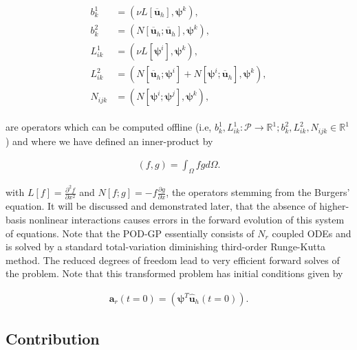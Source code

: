 \documentclass[preprint,12pt]{elsarticle}
\begin{document}
\begin{linenomath*}
\begin{align}
\begin{aligned} 
b_{k}^{1} &=\left(\nu L[\overline{\mathbf{u}}_h], \boldsymbol{\psi}^{k}\right), \\ 
b_{k}^{2} &=\left(N[\overline{\mathbf{u}}_h ; \overline{\mathbf{u}}_h], \boldsymbol{\psi}^{k}\right),  \\ 
L_{i k}^{1} &=\left(\nu L\left[\boldsymbol{\psi}^{i} \right], \boldsymbol{\psi}^{k} \right), \\ 
L_{i k}^{2} &=\left(N\left[\overline{\mathbf{u}}_h ; \boldsymbol{\psi}^{i}\right]+N\left[\boldsymbol{\psi}^{i} ; \overline{\mathbf{u}}_h\right], \boldsymbol{\psi}^{k}\right), \\ 
N_{i j k} &=\left(N\left[\boldsymbol{\psi}^{i} ; \boldsymbol{\psi}^{j}\right], \boldsymbol{\psi}^{k}\right),
\end{aligned}
\end{align}
\end{linenomath*}
are operators which can be computed offline (i.e, $b_k^1, L_{i k}^{1} : \mathcal{P} \rightarrow \mathbb{R}^{1}; b_k^2, L_{i k}^{2}, N_{i j k} \in \mathbb{R}^1$) and where we have defined an inner-product by
\begin{linenomath*}
\begin{align}
(f,g) = \int_\Omega fg d\Omega.
\end{align}
\end{linenomath*}
with $L[f] = \frac{\partial^2 f}{\partial x^2}$ and $N[f;g] = -f \frac{\partial g}{\partial x}$, the operators stemming from the Burgers' equation. It will be discussed and demonstrated later, that the absence of higher-basis nonlinear interactions causes errors in the forward evolution of this system of equations. Note that the POD-GP essentially consists of $N_r$ coupled ODEs and is solved by a standard total-variation diminishing third-order Runge-Kutta method. The reduced degrees of freedom lead to very efficient forward solves of the problem. Note that this transformed problem has initial conditions given by
\begin{linenomath*}
\begin{align}
\mathbf{a}_r(t=0)=\left(\boldsymbol{\psi}^T \hat{\mathbf{u}}_h(t=0) \right).
\end{align}
\end{linenomath*}

\subsection{Contribution}
\end{document}
